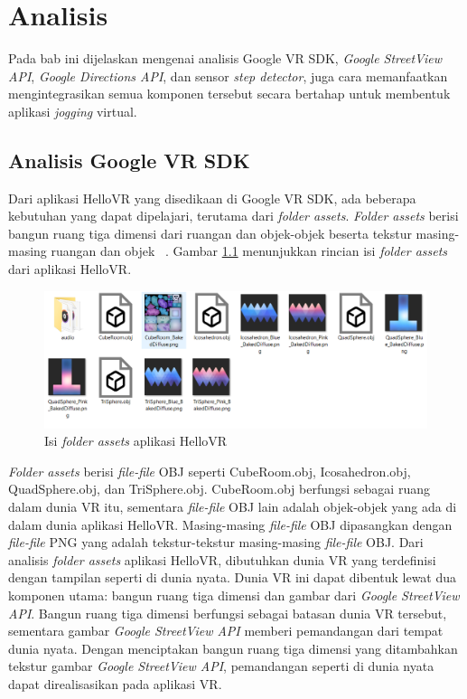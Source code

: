 \chapter{Analisis}
\label{chap:analisis}
Pada bab ini dijelaskan mengenai analisis Google VR SDK, \textit{Google StreetView API}, \textit{Google Directions API}, dan  sensor \textit{step detector}, juga cara memanfaatkan   mengintegrasikan semua komponen tersebut secara bertahap untuk membentuk aplikasi \textit{jogging} virtual. 


\section{Analisis Google VR SDK}
Dari aplikasi HelloVR yang disedikaan di Google VR SDK, ada beberapa kebutuhan yang dapat dipelajari, terutama dari \textit{folder assets}. \textit{Folder assets} berisi bangun ruang tiga dimensi dari ruangan dan objek-objek beserta tekstur masing-masing ruangan dan objek ~\cite{quickstart-google-vr}. Gambar \ref{fig:assets-folder} menunjukkan rincian isi \textit{folder assets} dari aplikasi HelloVR.

\begin{figure}[h]
	\centering
		\includegraphics[scale=0.7]{Gambar/assets-folder.png}
	\caption{Isi \textit{folder assets} aplikasi HelloVR}
	\label{fig:assets-folder}
\end{figure}

\textit{Folder assets} berisi \textit{file-file} OBJ seperti CubeRoom.obj, Icosahedron.obj, QuadSphere.obj, dan TriSphere.obj. CubeRoom.obj berfungsi sebagai ruang dalam dunia VR itu, sementara \textit{file-file} OBJ lain adalah objek-objek yang ada di dalam dunia aplikasi HelloVR. Masing-masing \textit{file-file} OBJ dipasangkan dengan \textit{file-file} PNG yang adalah tekstur-tekstur masing-masing \textit{file-file} OBJ. Dari analisis \textit{folder assets} aplikasi HelloVR, dibutuhkan dunia VR yang terdefinisi dengan tampilan seperti di dunia nyata. Dunia VR ini dapat dibentuk lewat dua komponen utama: bangun ruang tiga dimensi dan gambar dari \textit{Google StreetView API}. Bangun ruang tiga dimensi berfungsi sebagai batasan dunia VR tersebut, sementara gambar \textit{Google StreetView API} memberi pemandangan dari tempat dunia nyata. Dengan menciptakan bangun ruang tiga dimensi yang ditambahkan tekstur gambar \textit{Google StreetView API}, pemandangan seperti di dunia nyata dapat direalisasikan pada aplikasi VR. 

